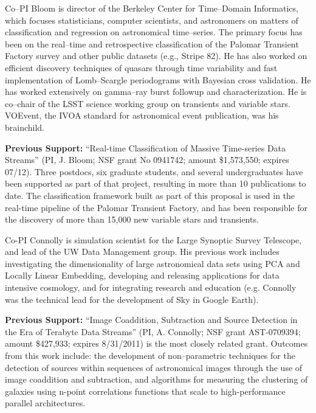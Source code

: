  \smallskip

Co--PI Bloom is director of the Berkeley Center for Time--Domain Informatics,
which focuses statisticians, computer scientists, and astronomers on matters of
classification and regression on astronomical time--series.  The primary focus
has been on the real--time and retrospective classification of the Palomar
Transient Factory survey and other public datasets (e.g., Stripe 82). He has
also worked on efficient discovery techniques of quasars through time
variability and fast implementation of Lomb--Scargle periodograms with Bayesian
cross validation. He has worked extensively on gamma--ray burst followup and
characterization. He is co--chair of the LSST science working group on
transients and variable stars. VOEvent, the IVOA standard for astronomical event
publication, was his brainchild.

{\bf Previous Support:} ``Real-time Classification of Massive Time-series Data
Streams'' (PI, J. Bloom; NSF grant No 0941742; amount \$1,573,550; expires
07/12).  Three postdocs, six graduate students, and several undergraduates have
been supported as part of that project, resulting in more than 10 publications
to date.  The classification framework built as part of this proposal is used in
the real-time pipeline of the Palomar Transient Factory, and has been
responsible for the discovery of more than 15,000 new variable stars and
transients.

 \smallskip

Co-PI Connolly is simulation scientist for the Large Synoptic Survey Telescope,
and lead of the UW Data Management group.  His previous work includes
investigating the dimensionality of large astronomical data sets using PCA and
Locally Linear Embedding, developing and releasing applications for data
intensive cosmology, and for integrating research and education (e.g. Connolly
was the technical lead for the development of Sky in Google Earth).

{\bf Previous Support:} ``Image Coaddition, Subtraction and Source Detection in
the Era of Terabyte Data Streams'' (PI, A. Connolly; NSF grant AST-0709394;
amount \$427,933; expires 8/31/2011) is the most closely related grant. 
Outcomes from this work include: the development of non--parametric techniques
for the detection of sources within sequences of astronomical images through the
use of image coaddition and subtraction, and algorithms for measuring the
clustering of galaxies using n-point correlations functions that scale to
high-performance parallel architectures.

